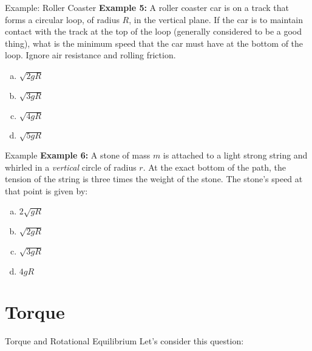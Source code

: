 \documentclass[12pt,compress,aspectratio=169]{beamer}
\begin{document}
\begin{frame}{Example: Roller Coaster}
  \textbf{Example 5:} A roller coaster car is on a track that forms a circular
  loop, of radius $R$, in the vertical plane. If the car is to maintain contact
  with the track at the top of the loop (generally considered to be a good
  thing), what is the minimum speed that the car must have at the bottom of the
  loop. Ignore air resistance and rolling friction.
  \begin{enumerate}[(a)]
  \item $\sqrt{2gR}$
  \item $\sqrt{3gR}$
  \item $\sqrt{4gR}$
  \item $\sqrt{5gR}$
  \end{enumerate}
\end{frame}


\begin{frame}{Example}
  \textbf{Example 6:} A stone of mass $m$ is attached to a light strong string
  and whirled in a \emph{vertical} circle of radius $r$. At the exact bottom of
  the path, the tension of the string is three times the weight of the stone.
  The stone's speed at that point is given by:
  \begin{enumerate}[(a)]
  \item $2\sqrt{gR}$
  \item $\sqrt{2gR}$
  \item $\sqrt{3gR}$
  \item $4gR$
  \end{enumerate}
\end{frame}


\section{Torque}

\begin{frame}{Torque and Rotational Equilibrium}
  Let's consider this question:
  \begin{center}
  \end{center}
\end{frame}
\end{document}
